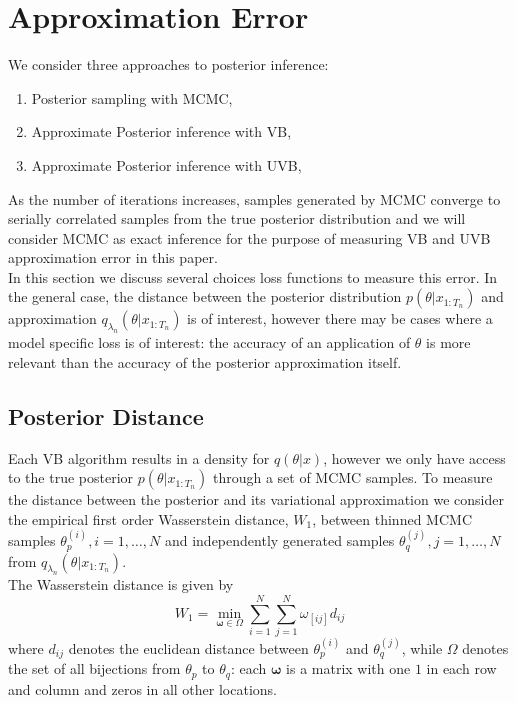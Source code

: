\documentclass[12pt,a4paper]{article}\usepackage[]{graphicx}\usepackage[]{color}
\begin{document}
\section{Approximation Error}

We consider three approaches to posterior inference:
\begin{enumerate}
\item Posterior sampling with MCMC,
\item Approximate Posterior inference with VB,
\item Approximate Posterior inference with UVB,
\end{enumerate}

As the number of iterations increases, samples generated by MCMC converge to serially correlated samples from the true posterior distribution and we will consider MCMC as exact inference for the purpose of measuring VB and UVB approximation error in this paper.
\\

In this section we discuss several choices loss functions to measure this error. In the general case, the distance between the posterior distribution $p(\theta | x_{1:T_n})$ and approximation $q_{\lambda_n}(\theta |  x_{1:T_n})$ is of interest, however there may be cases where a model specific loss is of interest: the accuracy of an application of $\theta$ is more relevant than the accuracy of the posterior approximation itself. 


\subsection{Posterior Distance}

Each VB algorithm results in a density for $q(\theta | x)$, however we only have access to the true posterior $p(\theta | x_{1:T_n})$ through a set of MCMC samples. To measure the distance between the posterior and its variational approximation we consider the empirical first order Wasserstein distance, $W_1$, between thinned MCMC samples $\theta^{(i)}_p, i = 1, \dots, N$ and independently generated samples $\theta^{(j)}_q, j = 1, \dots, N$ from $q_{\lambda_n}(\theta |  x_{1:T_n})$.
\\

The Wasserstein distance is given by
\begin{equation}
\label{wasserstein}
W_1 = \underset{\boldsymbol{\omega} \in \Omega}{\min} \sum_{i=1}^N \sum_{j=1}^N \omega_{[ij]} d_{ij}
\end{equation}
where $d_{ij}$ denotes the euclidean distance between $\theta^{(i)}_p$ and $\theta^{(j)}_q$, while $\Omega$ denotes the set of all bijections from $\theta_p$ to $\theta_q$: each $\boldsymbol{\omega}$ is a matrix with one $1$ in each row and column and zeros in all other locations.
\\
\end{document}
